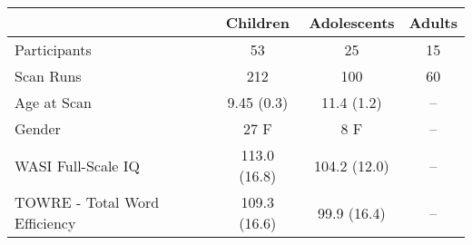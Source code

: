 \begin{tabular}{lccc}
\toprule 
 & Children & Adolescents & Adults  \\ 
\midrule 
Participants & 53 & 25 & 15  \\
Scan Runs & 212 & 100 & 60  \\
Age at Scan & 9.45 (0.3) & 11.4 (1.2)  &  --  \\
Gender  & 27 F & 8 F  &  --  \\ 
WASI Full-Scale IQ & 113.0 (16.8) & 104.2 (12.0)  &  --   \\ 
TOWRE - Total Word Efficiency & 109.3 (16.6) & 99.9 (16.4)  &  --  \\ 
\bottomrule 
\end{tabular}